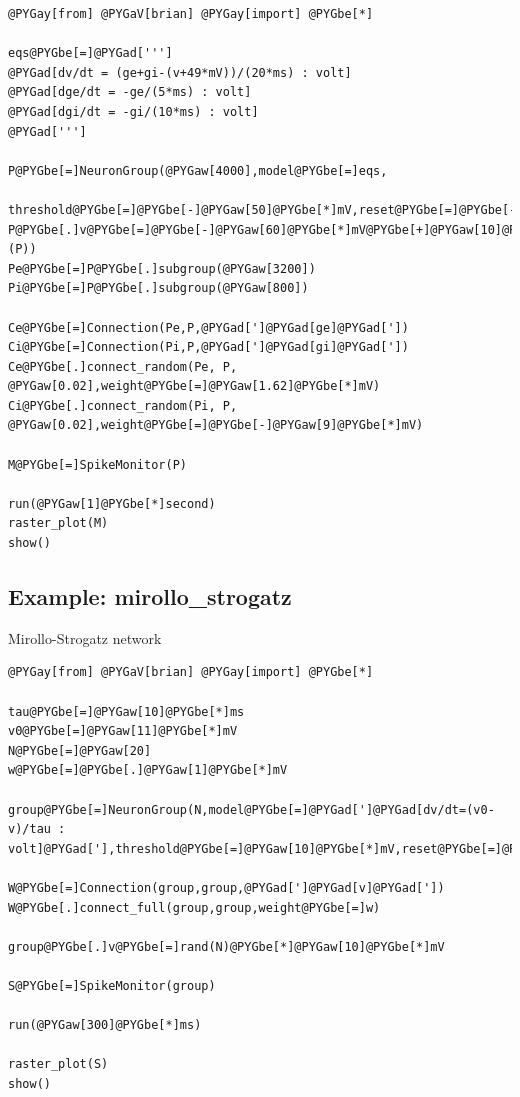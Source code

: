 \documentclass[letterpaper,10pt]{manual}
\begin{document}
\begin{Verbatim}[commandchars=@\[\]]
@PYGay[from] @PYGaV[brian] @PYGay[import] @PYGbe[*]

eqs@PYGbe[=]@PYGad[''']
@PYGad[dv/dt = (ge+gi-(v+49*mV))/(20*ms) : volt]
@PYGad[dge/dt = -ge/(5*ms) : volt]
@PYGad[dgi/dt = -gi/(10*ms) : volt]
@PYGad[''']

P@PYGbe[=]NeuronGroup(@PYGaw[4000],model@PYGbe[=]eqs,
              threshold@PYGbe[=]@PYGbe[-]@PYGaw[50]@PYGbe[*]mV,reset@PYGbe[=]@PYGbe[-]@PYGaw[60]@PYGbe[*]mV)
P@PYGbe[.]v@PYGbe[=]@PYGbe[-]@PYGaw[60]@PYGbe[*]mV@PYGbe[+]@PYGaw[10]@PYGbe[*]mV@PYGbe[*]rand(@PYGaX[len](P))
Pe@PYGbe[=]P@PYGbe[.]subgroup(@PYGaw[3200])
Pi@PYGbe[=]P@PYGbe[.]subgroup(@PYGaw[800])

Ce@PYGbe[=]Connection(Pe,P,@PYGad[']@PYGad[ge]@PYGad['])
Ci@PYGbe[=]Connection(Pi,P,@PYGad[']@PYGad[gi]@PYGad['])
Ce@PYGbe[.]connect_random(Pe, P, @PYGaw[0.02],weight@PYGbe[=]@PYGaw[1.62]@PYGbe[*]mV)
Ci@PYGbe[.]connect_random(Pi, P, @PYGaw[0.02],weight@PYGbe[=]@PYGbe[-]@PYGaw[9]@PYGbe[*]mV)

M@PYGbe[=]SpikeMonitor(P)

run(@PYGaw[1]@PYGbe[*]second)
raster_plot(M)
show()
\end{Verbatim}

\resetcurrentobjects
{}

\hypertarget{index-38}{}\subsection{Example: mirollo\_strogatz}

Mirollo-Strogatz network

\begin{Verbatim}[commandchars=@\[\]]
@PYGay[from] @PYGaV[brian] @PYGay[import] @PYGbe[*]

tau@PYGbe[=]@PYGaw[10]@PYGbe[*]ms
v0@PYGbe[=]@PYGaw[11]@PYGbe[*]mV
N@PYGbe[=]@PYGaw[20]
w@PYGbe[=]@PYGbe[.]@PYGaw[1]@PYGbe[*]mV

group@PYGbe[=]NeuronGroup(N,model@PYGbe[=]@PYGad[']@PYGad[dv/dt=(v0-v)/tau : volt]@PYGad['],threshold@PYGbe[=]@PYGaw[10]@PYGbe[*]mV,reset@PYGbe[=]@PYGaw[0]@PYGbe[*]mV)

W@PYGbe[=]Connection(group,group,@PYGad[']@PYGad[v]@PYGad['])
W@PYGbe[.]connect_full(group,group,weight@PYGbe[=]w)

group@PYGbe[.]v@PYGbe[=]rand(N)@PYGbe[*]@PYGaw[10]@PYGbe[*]mV

S@PYGbe[=]SpikeMonitor(group)

run(@PYGaw[300]@PYGbe[*]ms)

raster_plot(S)
show()
\end{Verbatim}
\end{document}
